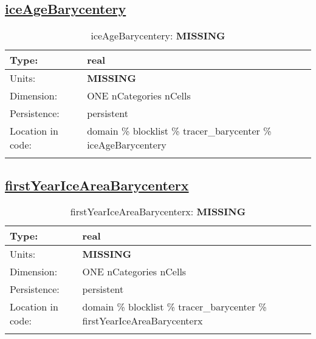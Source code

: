 \subsection[iceAgeBarycentery]{\hyperref[sec:var_tab_tracer_barycenter]{iceAgeBarycentery}}
\label{subsec:var_sec_tracer_barycenter_iceAgeBarycentery}
\begin{center}
\begin{longtable}{| p{2.0in} | p{4.0in} |}
        \hline 
        Type: & real \\
        \hline 
        Units: & {\bf \color{red} MISSING} \\
        \hline 
        Dimension: & ONE nCategories nCells \\
        \hline 
        Persistence: & persistent \\
        \hline 
         Location in code: & domain \% blocklist \% tracer\_barycenter \% iceAgeBarycentery \\
         \hline 
    \caption{iceAgeBarycentery: {\bf \color{red} MISSING}}
\end{longtable}
\end{center}
\subsection[firstYearIceAreaBarycenterx]{\hyperref[sec:var_tab_tracer_barycenter]{firstYearIceAreaBarycenterx}}
\label{subsec:var_sec_tracer_barycenter_firstYearIceAreaBarycenterx}
\begin{center}
\begin{longtable}{| p{2.0in} | p{4.0in} |}
        \hline 
        Type: & real \\
        \hline 
        Units: & {\bf \color{red} MISSING} \\
        \hline 
        Dimension: & ONE nCategories nCells \\
        \hline 
        Persistence: & persistent \\
        \hline 
         Location in code: & domain \% blocklist \% tracer\_barycenter \% firstYearIceAreaBarycenterx \\
         \hline 
    \caption{firstYearIceAreaBarycenterx: {\bf \color{red} MISSING}}
\end{longtable}
\end{center}
